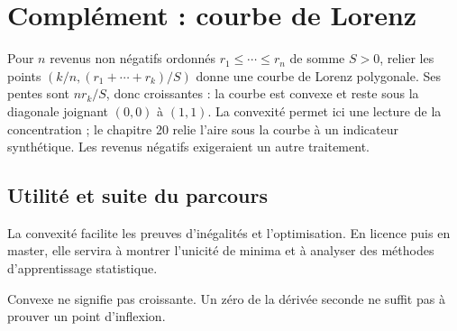 \documentclass[../cours_tle.tex]{subfiles}
\begin{document}
\section{Complément : courbe de Lorenz}
Pour $n$ revenus non négatifs ordonnés $r_1\le\cdots\le r_n$ de somme $S>0$, relier les points
$(k/n,(r_1+\cdots+r_k)/S)$ donne une courbe de Lorenz polygonale.
Ses pentes sont $nr_k/S$, donc croissantes : la courbe est convexe et reste sous la diagonale joignant $(0,0)$ à $(1,1)$.
La convexité permet ici une lecture de la concentration ; le chapitre 20 relie l'aire sous la courbe à un indicateur synthétique. Les revenus négatifs exigeraient un autre traitement.
\begin{finchapitre}
\section{Utilité et suite du parcours}
La convexité facilite les preuves d'inégalités et l'optimisation. En licence puis en master, elle servira à montrer l'unicité de minima et à analyser des méthodes d'apprentissage statistique.
\begin{retenir}
Convexe ne signifie pas croissante. Un zéro de la dérivée seconde ne suffit pas à prouver un point d'inflexion.
\end{retenir}
\end{finchapitre}
\end{document}
